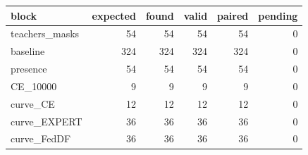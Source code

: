 \begin{tabular}{lrrrrr}
\toprule
block & expected & found & valid & paired & pending \\
\midrule
teachers\_masks & 54 & 54 & 54 & 54 & 0 \\
baseline & 324 & 324 & 324 & 324 & 0 \\
presence & 54 & 54 & 54 & 54 & 0 \\
CE\_10000 & 9 & 9 & 9 & 9 & 0 \\
curve\_CE & 12 & 12 & 12 & 12 & 0 \\
curve\_EXPERT & 36 & 36 & 36 & 36 & 0 \\
curve\_FedDF & 36 & 36 & 36 & 36 & 0 \\
\bottomrule
\end{tabular}
